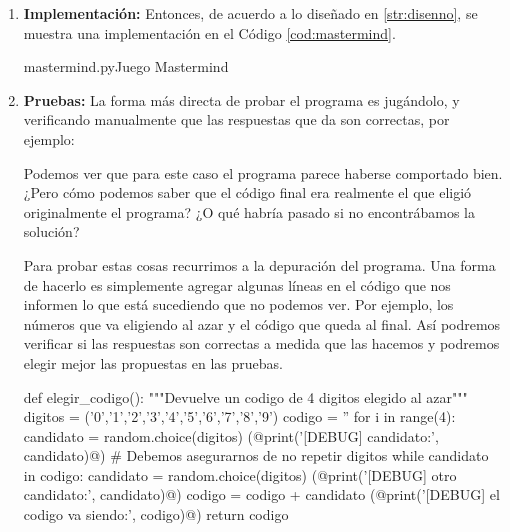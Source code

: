 \begin{enumerate}
\item {\bf Implementación:}
Entonces, de acuerdo a lo diseñado en \ref{str:disenno}, se muestra una
implementación en el Código \ref{cod:mastermind}.

\begin{codigo}{\label{cod:mastermind} mastermind.py}{Juego Mastermind}

\end{codigo}

\item {\bf Pruebas:}
La forma más directa de probar el programa es jugándolo, y verificando
manualmente que las respuestas que da son correctas, por ejemplo:


Podemos ver que para este caso el programa parece haberse comportado bien.
¿Pero cómo podemos saber que el código final era realmente el que eligió
originalmente el programa? ¿O qué habría pasado si no encontrábamos la
solución?

Para probar estas cosas recurrimos a la depuración del programa. Una forma
de hacerlo es simplemente agregar algunas líneas en el código que nos
informen lo que está sucediendo que no podemos ver. Por ejemplo, los
números que va eligiendo al azar y el código que queda al final. Así
podremos verificar si las respuestas son correctas a medida que las hacemos
y podremos elegir mejor las propuestas en las pruebas.

\begin{codigo-python-sn}
def elegir_codigo():
    """Devuelve un codigo de 4 digitos elegido al azar"""
    digitos = ('0','1','2','3','4','5','6','7','8','9')
    codigo = ''
    for i in range(4):
        candidato = random.choice(digitos)
        (@print('[DEBUG] candidato:', candidato)@)
        # Debemos asegurarnos de no repetir digitos
        while candidato in codigo:
            candidato = random.choice(digitos)
            (@print('[DEBUG] otro candidato:', candidato)@)
        codigo = codigo + candidato
        (@print('[DEBUG] el codigo va siendo:', codigo)@)
    return codigo
\end{codigo-python-sn}


\end{enumerate}
